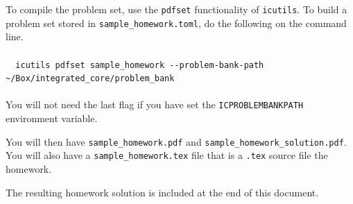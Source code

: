 To compile the problem set, use the \verb|pdfset| functionality of \verb|icutils|. To build a problem set stored in \verb|sample_homework.toml|, do the following on the command line.\\\\
{\footnotesize \verb|  icutils pdfset sample_homework --problem-bank-path ~/Box/integrated_core/problem_bank|}\\\\
You will not need the last flag if you have set the \verb|ICPROBLEMBANKPATH| environment variable.

You will then have \verb|sample_homework.pdf| and \verb|sample_homework_solution.pdf|. You will also have a \verb|sample_homework.tex| file that is a \texttt{.tex} source file the homework.

The resulting homework solution is included at the end of this document.

\pagebreak



